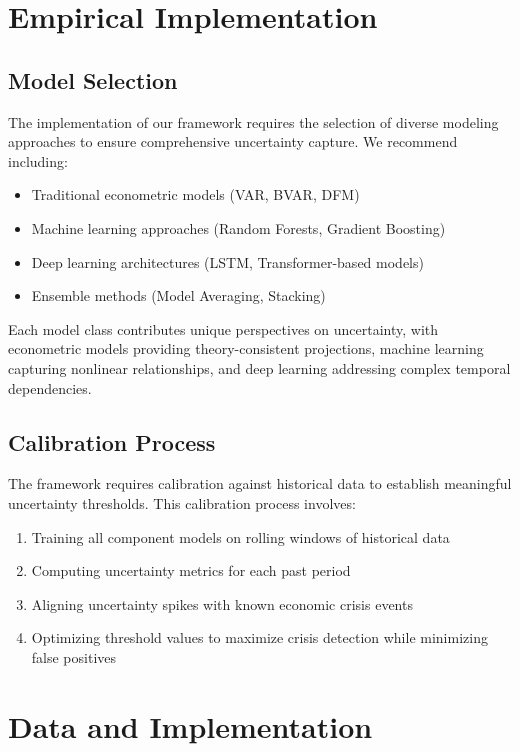 \documentclass[5p,authoryear]{elsarticle}
\begin{document}
\section{Empirical Implementation}

\subsection{Model Selection}

The implementation of our framework requires the selection of diverse modeling approaches to ensure comprehensive uncertainty capture. We recommend including:

\begin{itemize}
    \item Traditional econometric models (VAR, BVAR, DFM)
    \item Machine learning approaches (Random Forests, Gradient Boosting)
    \item Deep learning architectures (LSTM, Transformer-based models)
    \item Ensemble methods (Model Averaging, Stacking)
\end{itemize}

Each model class contributes unique perspectives on uncertainty, with econometric models providing theory-consistent projections, machine learning capturing nonlinear relationships, and deep learning addressing complex temporal dependencies.

\subsection{Calibration Process}

The framework requires calibration against historical data to establish meaningful uncertainty thresholds. This calibration process involves:

\begin{enumerate}
    \item Training all component models on rolling windows of historical data
    \item Computing uncertainty metrics for each past period
    \item Aligning uncertainty spikes with known economic crisis events
    \item Optimizing threshold values to maximize crisis detection while minimizing false positives
\end{enumerate}

\section{Data and Implementation}
\end{document}
